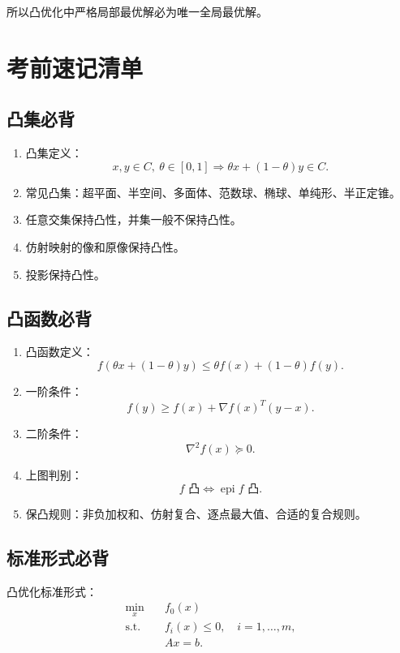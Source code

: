 \documentclass[11pt,a4paper]{ctexart}
\newcommand{\epi}{\operatorname{epi}}
\newcommand{\st}{\text{s.t.}}
\theoremstyle{definition}
\theoremstyle{plain}
\theoremstyle{remark}
\begin{document}
所以凸优化中严格局部最优解必为唯一全局最优解。

\newpage

\section{考前速记清单}

\subsection*{凸集必背}

\begin{enumerate}[label=\arabic*.]
    \item 凸集定义：
    \[
        x,y\in C,\ \theta\in[0,1]
        \Rightarrow
        \theta x+(1-\theta)y\in C.
    \]
    \item 常见凸集：超平面、半空间、多面体、范数球、椭球、单纯形、半正定锥。
    \item 任意交集保持凸性，并集一般不保持凸性。
    \item 仿射映射的像和原像保持凸性。
    \item 投影保持凸性。
\end{enumerate}

\subsection*{凸函数必背}

\begin{enumerate}[label=\arabic*.]
    \item 凸函数定义：
    \[
        f(\theta x+(1-\theta)y)
        \le
        \theta f(x)+(1-\theta)f(y).
    \]
    \item 一阶条件：
    \[
        f(y)\ge f(x)+\nabla f(x)^T(y-x).
    \]
    \item 二阶条件：
    \[
        \nabla^2 f(x)\succeq0.
    \]
    \item 上图判别：
    \[
        f\text{ 凸}
        \Longleftrightarrow
        \epi f\text{ 凸}.
    \]
    \item 保凸规则：非负加权和、仿射复合、逐点最大值、合适的复合规则。
\end{enumerate}

\subsection*{标准形式必背}

凸优化标准形式：
\[
\begin{aligned}
    \min_x\quad & f_0(x)\\
    \st\quad & f_i(x)\le0,\quad i=1,\dots,m,\\
    & Ax=b.
\end{aligned}
\]
\end{document}
